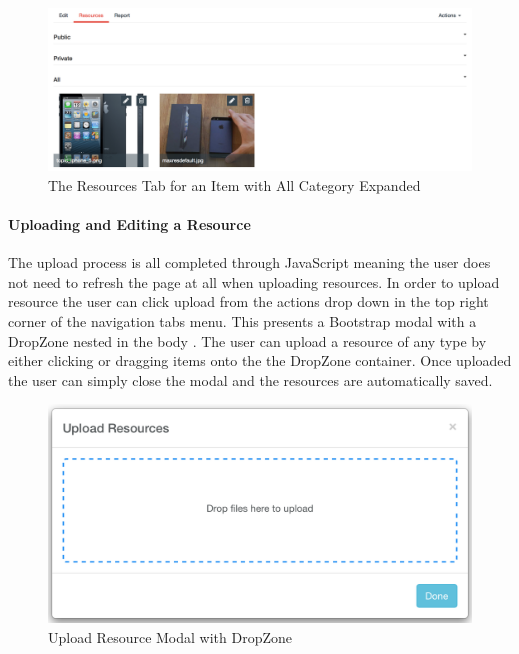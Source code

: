 \begin{figure}[H]
	\centering
	\includegraphics[width=1.0\textwidth]{images/Frisk/Item_Resources}
	\caption{The Resources Tab for an Item with All Category Expanded} \label{fig:Item_Resources}
\end{figure}

\paragraph{Uploading and Editing a Resource}
The upload process is all completed through JavaScript meaning the user does not need to refresh the page at all when uploading resources. In order to upload resource the user can click upload from the actions drop down in the top right corner of the navigation tabs menu. This presents a Bootstrap modal with a DropZone nested in the body \cite{DropZone:Home}. The user can upload a resource of any type by either clicking or dragging items onto the the DropZone container. Once uploaded the user can simply close the modal and the resources are automatically saved.

\begin{figure}[H]
	\centering
	\includegraphics[width=1.0\textwidth]{images/Frisk/Upload_Resource}
	\caption{Upload Resource Modal with DropZone} \label{fig:Upload_Resource}
\end{figure}

